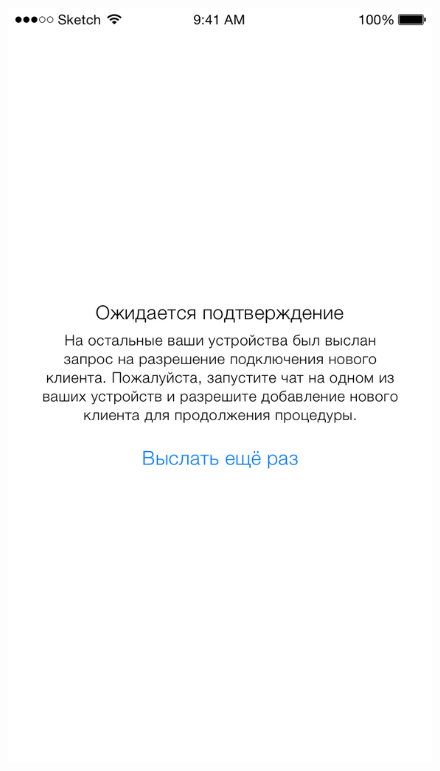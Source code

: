 \begin{figure}[H]
\centering
\begin{minipage}{.5\textwidth}
  \centering
  \includegraphics[height=0.25\textheight]{inc/img/ui/login_approve_screen.png}
  \label{sec:usage:deviceactivation:newdevice}
\end{minipage}%
\begin{minipage}{.5\textwidth}
  \centering

\end{minipage}
\end{figure}
